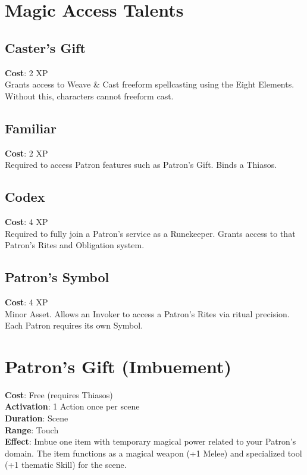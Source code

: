 \section{Magic Access Talents}

\subsection*{Caster's Gift}
\textbf{Cost}: 2 XP \\
Grants access to Weave \& Cast freeform spellcasting using the Eight Elements. Without this, characters cannot freeform cast.

\subsection*{Familiar}
\textbf{Cost}: 2 XP \\
Required to access Patron features such as Patron's Gift. Binds a Thiasos.

\subsection*{Codex}
\textbf{Cost}: 4 XP \\
Required to fully join a Patron's service as a Runekeeper. Grants access to that Patron's Rites and Obligation system.

\subsection*{Patron's Symbol}
\textbf{Cost}: 4 XP \\
Minor Asset. Allows an Invoker to access a Patron's Rites via ritual precision. Each Patron requires its own Symbol.

\section{Patron's Gift (Imbuement)}

\textbf{Cost}: Free (requires Thiasos) \\
\textbf{Activation}: 1 Action once per scene \\
\textbf{Duration}: Scene \\
\textbf{Range}: Touch \\
\textbf{Effect}: Imbue one item with temporary magical power related to your Patron's domain. The item functions as a magical weapon (+1 Melee) and specialized tool (+1 thematic Skill) for the scene.

